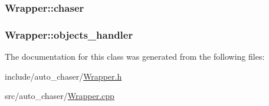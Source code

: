 \subsubsection[{\texorpdfstring{chaser}{chaser}}]{ Wrapper\+::chaser}\hypertarget{class_wrapper_a750309ad3470e20a80e9d72b0d7e34cb}{}\label{class_wrapper_a750309ad3470e20a80e9d72b0d7e34cb}
\subsubsection[{\texorpdfstring{objects\+\_\+handler}{objects_handler}}]{ Wrapper\+::objects\+\_\+handler}\hypertarget{class_wrapper_a8cddd5ffbaeb5ab0b5d8d8d0c74f810f}{}\label{class_wrapper_a8cddd5ffbaeb5ab0b5d8d8d0c74f810f}


The documentation for this class was generated from the following files\+:\begin{DoxyCompactItemize}
\item 
include/auto\+\_\+chaser/\hyperlink{_wrapper_8h}{Wrapper.\+h}\item 
src/auto\+\_\+chaser/\hyperlink{_wrapper_8cpp}{Wrapper.\+cpp}\end{DoxyCompactItemize}
